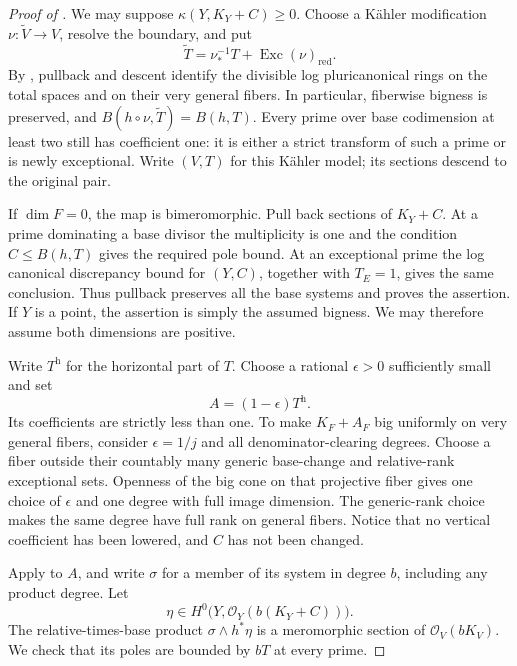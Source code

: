 \begin{proof}[Proof of ]
We may suppose \(\kappa(Y,K_Y+C)\geq0\).
Choose a Kähler modification \(\nu\colon\widetilde V\to V\),
resolve the boundary,
and put
\[
  \widetilde T=\nu_*^{-1}T+\operatorname{Exc}(\nu)_{\mathrm{red}}.
\]
By ,
pullback and descent identify the divisible log pluricanonical rings
on the total spaces and on their very general fibers.  In particular,
fiberwise bigness is preserved, and
\(B(h\circ\nu,\widetilde T)=B(h,T)\).
Every prime over base codimension at least two still has coefficient
one: it is either a strict transform of such a prime or is newly
exceptional.  Write \((V,T)\) for this Kähler model; its sections
descend to the original pair.

If \(\dim F=0\), the map is bimeromorphic.  Pull back sections
of \(K_Y+C\).  At a prime dominating a base divisor the
multiplicity is one and the condition \(C\leq B(h,T)\) gives
the required pole bound.  At an exceptional prime the
log canonical discrepancy bound for \((Y,C)\), together with
\(T_E=1\), gives the same conclusion.  Thus pullback preserves
all the base systems and proves the assertion.  If \(Y\) is a
point, the assertion is simply the assumed bigness.  We may
therefore assume both dimensions are positive.

Write \(T^{\mathrm h}\) for the horizontal part of \(T\).
Choose a rational \(\epsilon>0\) sufficiently small and set
\[
  A=(1-\epsilon)T^{\mathrm h}.
\]
Its coefficients are strictly less than one.
To make \(K_F+A_F\) big uniformly on very general fibers, consider
\(\epsilon=1/j\) and all denominator-clearing degrees.  Choose a fiber
outside their countably many generic base-change and relative-rank
exceptional sets.
Openness of the big cone on that projective fiber gives one
choice of \(\epsilon\) and one degree with full image dimension.
The generic-rank choice makes the same degree have full rank
on general fibers.  Notice that no vertical coefficient has
been lowered, and \(C\) has not been changed.

Apply  to \(A\), and write
\(\sigma\) for a member of its system in degree \(b\), including
any product degree.  Let
\[
  \eta\in H^0\bigl(Y,\mathcal O_Y(b(K_Y+C))\bigr).
\]
The relative-times-base product
\(\sigma\wedge h^*\eta\) is a meromorphic section of
\(\mathcal O_V(bK_V)\).  We check that its poles are bounded by
\(bT\) at every prime.


\end{proof}
